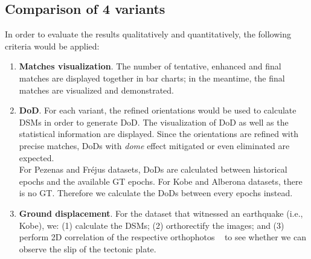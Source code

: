 \subsection{Comparison of 4 variants}
\label{Comparisonof6variantsP}
In order to evaluate the results qualitatively and quantitatively, the following criteria would be applied:\\
\begin{enumerate}
	\item \textbf{Matches visualization}. The number of tentative, enhanced and final matches are displayed together in bar charts; in the meantime, the final matches are visualized and demonstrated.
	\item \textbf{\ac{DoD}}. For each variant, the refined orientations would be used to calculate \ac{DSM}s in order to generate \ac{DoD}. The visualization of \ac{DoD} as well as the statistical information are displayed. Since the orientations are refined with precise matches, \ac{DoD}s with \textit{dome} effect mitigated or even eliminated are expected.\\
	For Pezenas and Fr{\'e}jus datasets, \ac{DoD}s are calculated between historical epochs and the available \ac{GT} epochs. For Kobe and Alberona datasets, there is no \ac{GT}. Therefore we calculate the \ac{DoD}s between every epochs instead.\\
	\item \textbf{Ground displacement}. For the dataset that witnessed an earthquake (i.e., Kobe), we: (1) calculate the \ac{DSM}s; (2) orthorectify the images; and (3) perform 2D correlation of the respective orthophotos ~\cite{rosu2015measurement} to see whether we can observe the slip of the tectonic plate.
\end{enumerate}

